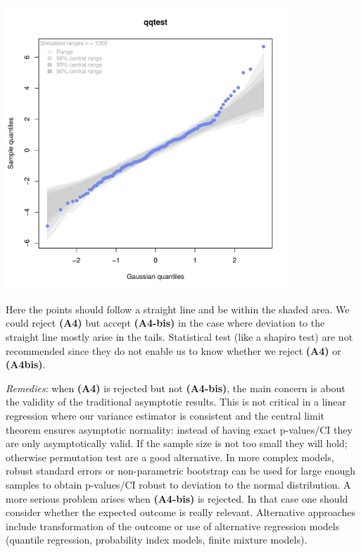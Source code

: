 \documentclass[12pt]{article}
\begin{document}
\begin{center}
\includegraphics[width=0.8\textwidth]{./figures/A4-qqplot-res.pdf}
\end{center}

Here the points should follow a straight line and be within the shaded
area. We could reject \textbf{(A4)} but accept \textbf{(A4-bis)} in the case where
deviation to the straight line mostly arise in the tails.  Statistical
test (like a shapiro test) are not recommended since they do not
enable us to know whether we reject \textbf{(A4)} or \textbf{(A4bis)}. 

\bigskip

\emph{Remedies}: when \textbf{(A4)} is rejected but not \textbf{(A4-bis)}, the main
concern is about the validity of the traditional asymptotic
results. This is not critical in a linear regression where our
variance estimator is consistent and the central limit theorem ensures
asymptotic normality: instead of having exact p-values/CI they are
only asymptotically valid. If the sample size is not too small they
will hold; otherwise permutation test are a good alternative. In more
complex models, robust standard errors or non-parametric bootstrap can
be used for large enough samples to obtain p-values/CI robust to
deviation to the normal distribution. \newline A more serious problem
arises when \textbf{(A4-bis)} is rejected. In that case one should consider
whether the expected outcome is really relevant. Alternative
approaches include transformation of the outcome or use of alternative
regression models (quantile regression, probability index models,
finite mixture models).
\end{document}
